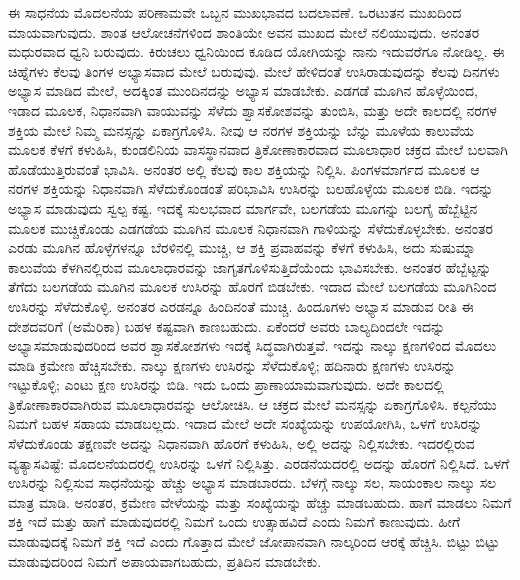 ಈ ಸಾಧನೆಯ ಮೊದಲನೆಯ ಪರಿಣಾಮವೇ ಒಬ್ಬನ ಮುಖಭಾವದ ಬದಲಾವಣೆ. ಒರಟುತನ ಮುಖದಿಂದ ಮಾಯವಾಗುವುದು. ಶಾಂತ ಆಲೋಚನೆಗಳಿಂದ ಶಾಂತಿಯೇ ಅವನ ಮುಖದ ಮೇಲೆ ನಲಿಯುವುದು. ಅನಂತರ ಮಧುರವಾದ ಧ್ವನಿ ಬರುವುದು. ಕಿರುಚಲು ಧ್ವನಿಯಿಂದ ಕೂಡಿದ ಯೋಗಿಯನ್ನು ನಾನು ಇದುವರೆಗೂ ನೋಡಿಲ್ಲ. ಈ ಚಿಹ್ನೆಗಳು ಕೆಲವು ತಿಂಗಳ ಅಭ್ಯಾಸವಾದ ಮೇಲೆ ಬರುವುವು. ಮೇಲೆ ಹೇಳಿದಂತೆ ಉಸಿರಾಡುವುದನ್ನು ಕೆಲವು ದಿನಗಳು ಅಭ್ಯಾಸ ಮಾಡಿದ ಮೇಲೆ, ಅದಕ್ಕಿಂತ ಮುಂದಿನದನ್ನು ಅಭ್ಯಾಸ ಮಾಡಬೇಕು. ಎಡಗಡೆ ಮೂಗಿನ ಹೊಳ್ಳೆಯಿಂದ, ಇಡಾದ ಮೂಲಕ, ನಿಧಾನವಾಗಿ ವಾಯುವನ್ನು ಸೆಳೆದು ಶ್ವಾಸಕೋಶವನ್ನು ತುಂಬಿಸಿ, ಮತ್ತು ಅದೇ ಕಾಲದಲ್ಲಿ ನರಗಳ ಶಕ್ತಿಯ ಮೇಲೆ ನಿಮ್ಮ ಮನಸ್ಸನ್ನು ಏಕಾಗ್ರಗೊಳಿಸಿ. ನೀವು ಆ ನರಗಳ ಶಕ್ತಿಯನ್ನು ಬೆನ್ನು ಮೂಳೆಯ ಕಾಲುವೆಯ ಮೂಲಕ ಕೆಳಗೆ ಕಳುಹಿಸಿ, ಕುಂಡಲಿನಿಯ ವಾಸಸ್ಥಾನವಾದ ತ್ರಿಕೋಣಾಕಾರವಾದ ಮೂಲಾಧಾರ ಚಕ್ರದ ಮೇಲೆ ಬಲವಾಗಿ ಹೊಡೆಯುತ್ತಿರುವಂತೆ ಭಾವಿಸಿ. ಅನಂತರ ಅಲ್ಲಿ ಕೆಲವು ಕಾಲ ಶಕ್ತಿಯನ್ನು ನಿಲ್ಲಿಸಿ. ಪಿಂಗಳಮಾರ್ಗದ ಮೂಲಕ ಆ ನರಗಳ ಶಕ್ತಿಯನ್ನು ನಿಧಾನವಾಗಿ ಸೆಳೆದುಕೊಂಡಂತೆ ಪರಿಭಾವಿಸಿ ಉಸಿರನ್ನು ಬಲಹೊಳ್ಳೆಯ ಮೂಲಕ ಬಿಡಿ. ಇದನ್ನು ಅಭ್ಯಾಸ ಮಾಡುವುದು ಸ್ವಲ್ಪ ಕಷ್ಟ. ಇದಕ್ಕೆ ಸುಲಭವಾದ ಮಾರ್ಗವೇ, ಬಲಗಡೆಯ ಮೂಗನ್ನು ಬಲಗೈ ಹೆಬ್ಬೆಟ್ಟಿನ ಮೂಲಕ ಮುಚ್ಚಿಕೊಂಡು ಎಡಗಡೆಯ ಮೂಗಿನ ಮೂಲಕ ನಿಧಾನವಾಗಿ ಗಾಳಿಯನ್ನು ಸೆಳೆದುಕೊಳ್ಳಬೇಕು. ಅನಂತರ ಎರಡು ಮೂಗಿನ ಹೊಳ್ಳೆಗಳನ್ನೂ ಬೆರಳಿನಲ್ಲಿ ಮುಚ್ಚಿ, ಆ ಶಕ್ತಿ ಪ್ರವಾಹವನ್ನು ಕೆಳಗೆ ಕಳುಹಿಸಿ, ಅದು ಸುಷುಮ್ನಾ ಕಾಲುವೆಯ ಕೆಳಗಿನಲ್ಲಿರುವ ಮೂಲಾಧಾರವನ್ನು ಜಾಗೃತಗೊಳಿಸುತ್ತಿದೆಯೆಂದು ಭಾವಿಸಬೇಕು. ಅನಂತರ ಹೆಬ್ಬೆಟ್ಟನ್ನು ತೆಗೆದು ಬಲಗಡೆಯ ಮೂಗಿನ ಮೂಲಕ ಉಸಿರನ್ನು ಹೊರಗೆ ಬಿಡಬೇಕು. ಇದಾದ ಮೇಲೆ ಬಲಗಡೆಯ ಮೂಗಿನಿಂದ ಉಸಿರನ್ನು ಸೆಳೆದುಕೊಳ್ಳಿ. ಅನಂತರ ಎರಡನ್ನೂ ಹಿಂದಿನಂತೆ ಮುಚ್ಚಿ. ಹಿಂದೂಗಳು ಅಭ್ಯಾಸ ಮಾಡುವ ರೀತಿ ಈ ದೇಶದವರಿಗೆ (ಅಮೆರಿಕಾ) ಬಹಳ ಕಷ್ಟವಾಗಿ ಕಾಣಬಹುದು. ಏಕೆಂದರೆ ಅವರು ಬಾಲ್ಯದಿಂದಲೇ ಇದನ್ನು ಅಭ್ಯಾಸಮಾಡುವುದರಿಂದ ಅವರ ಶ್ವಾಸಕೋಶಗಳು ಇದಕ್ಕೆ ಸಿದ್ಧವಾಗಿರುತ್ತವೆ. ಇದನ್ನು ನಾಲ್ಕು ಕ್ಷಣಗಳಿಂದ ಮೊದಲು ಮಾಡಿ ಕ್ರಮೇಣ ಹೆಚ್ಚಿಸಬೇಕು. ನಾಲ್ಕು ಕ್ಷಣಗಳು ಉಸಿರನ್ನು ಸೆಳೆದುಕೊಳ್ಳಿ; ಹದಿನಾರು ಕ್ಷಣಗಳು ಉಸಿರನ್ನು ಇಟ್ಟುಕೊಳ್ಳಿ; ಎಂಟು ಕ್ಷಣ ಉಸಿರನ್ನು ಬಿಡಿ. ಇದು ಒಂದು ಪ್ರಾಣಾಯಾಮವಾಗುವುದು. ಅದೇ ಕಾಲದಲ್ಲಿ ತ್ರಿಕೋಣಾಕಾರವಾಗಿರುವ ಮೂಲಾಧಾರವನ್ನು ಆಲೋಚಿಸಿ. ಆ ಚಕ್ರದ ಮೇಲೆ ಮನಸ್ಸನ್ನು ಏಕಾಗ್ರಗೊಳಿಸಿ. ಕಲ್ಪನೆಯು ನಿಮಗೆ ಬಹಳ ಸಹಾಯ ಮಾಡಬಲ್ಲದು. ಇದಾದ ಮೇಲೆ ಅದೇ ಸಂಖ್ಯೆಯನ್ನು ಉಪಯೋಗಿಸಿ, ಒಳಗೆ ಉಸಿರನ್ನು ಸೆಳೆದುಕೊಂಡು ತಕ್ಷಣವೇ ಅದನ್ನು ನಿಧಾನವಾಗಿ ಹೊರಗೆ ಕಳುಹಿಸಿ, ಅಲ್ಲಿ ಅದನ್ನು ನಿಲ್ಲಿಸಬೇಕು. ಇದರಲ್ಲಿರುವ ವ್ಯತ್ಯಾಸವಿಷ್ಟೆ: ಮೊದಲನೆಯದರಲ್ಲಿ ಉಸಿರನ್ನು ಒಳಗೆ ನಿಲ್ಲಿಸಿತ್ತು. ಎರಡನೆಯದರಲ್ಲಿ ಅದನ್ನು ಹೊರಗೆ ನಿಲ್ಲಿಸಿದೆ. ಒಳಗೆ ಉಸಿರನ್ನು ನಿಲ್ಲಿಸುವ ಸಾಧನೆಯನ್ನು ಹೆಚ್ಚು ಅಭ್ಯಾಸ ಮಾಡಬಾರದು. ಬೆಳಗ್ಗೆ ನಾಲ್ಕು ಸಲ, ಸಾಯಂಕಾಲ ನಾಲ್ಕು ಸಲ ಮಾತ್ರ ಮಾಡಿ. ಅನಂತರ, ಕ್ರಮೇಣ ವೇಳೆಯನ್ನು ಮತ್ತು ಸಂಖ್ಯೆಯನ್ನು ಹೆಚ್ಚು ಮಾಡಬಹುದು. ಹಾಗೆ ಮಾಡಲು ನಿಮಗೆ ಶಕ್ತಿ ಇದೆ ಮತ್ತು ಹಾಗೆ ಮಾಡುವುದರಲ್ಲಿ ನಿಮಗೆ ಒಂದು ಉತ್ಸಾಹವಿದೆ ಎಂದು ನಿಮಗೆ ಕಾಣುವುದು. ಹೀಗೆ ಮಾಡುವುದಕ್ಕೆ ನಿಮಗೆ ಶಕ್ತಿ ಇದೆ ಎಂದು ಗೊತ್ತಾದ ಮೇಲೆ ಜೋಪಾನವಾಗಿ ನಾಲ್ಕರಿಂದ ಆರಕ್ಕೆ ಹೆಚ್ಚಿಸಿ. ಬಿಟ್ಟು ಬಿಟ್ಟು ಮಾಡುವುದರಿಂದ ನಿಮಗೆ ಅಪಾಯವಾಗಬಹುದು, ಪ್ರತಿದಿನ ಮಾಡಬೇಕು. 

